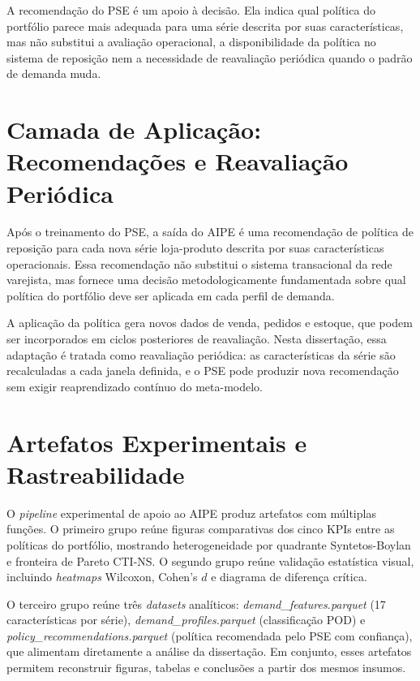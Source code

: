 A recomendação do PSE é um apoio à decisão. Ela indica qual política do portfólio parece mais adequada para uma série descrita por suas características, mas não substitui a avaliação operacional, a disponibilidade da política no sistema de reposição nem a necessidade de reavaliação periódica quando o padrão de demanda muda.

\section{Camada de Aplicação: Recomendações e Reavaliação Periódica}
\label{sec:aplicacao_aipe}

Após o treinamento do PSE, a saída do AIPE é uma recomendação de política de reposição para cada nova série loja-produto descrita por suas características operacionais. Essa recomendação não substitui o sistema transacional da rede varejista, mas fornece uma decisão metodologicamente fundamentada sobre qual política do portfólio deve ser aplicada em cada perfil de demanda.

A aplicação da política gera novos dados de venda, pedidos e estoque, que podem ser incorporados em ciclos posteriores de reavaliação. Nesta dissertação, essa adaptação é tratada como reavaliação periódica: as características da série são recalculadas a cada janela definida, e o PSE pode produzir nova recomendação sem exigir reaprendizado contínuo do meta-modelo.

\section{Artefatos Experimentais e Rastreabilidade}
\label{sec:reporting}

O \textit{pipeline} experimental de apoio ao AIPE produz artefatos com múltiplas funções. O primeiro grupo reúne figuras comparativas dos cinco KPIs entre as políticas do portfólio, mostrando heterogeneidade por quadrante Syntetos-Boylan e fronteira de Pareto CTI-NS. O segundo grupo reúne validação estatística visual, incluindo \textit{heatmaps} Wilcoxon, Cohen's $d$ e diagrama de diferença crítica.

O terceiro grupo reúne três \textit{datasets} analíticos: \textit{demand\_features.parquet} (17 características por série), \textit{demand\_profiles.parquet} (classificação POD) e \textit{policy\_recommendations.parquet} (política recomendada pelo PSE com confiança), que alimentam diretamente a análise da dissertação. Em conjunto, esses artefatos permitem reconstruir figuras, tabelas e conclusões a partir dos mesmos insumos.

